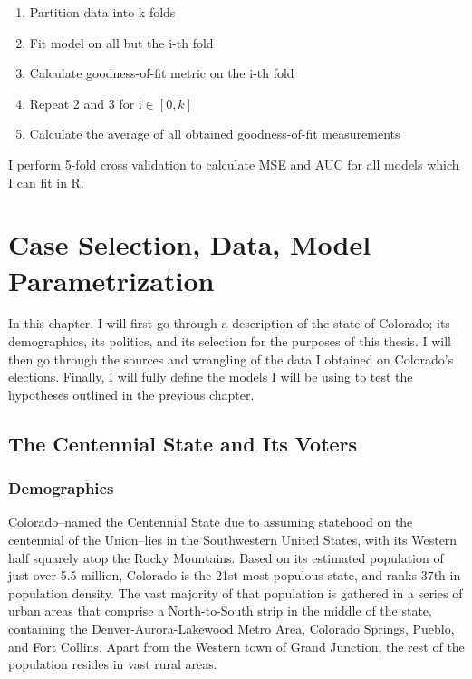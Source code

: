 \documentclass[12pt,twoside]{reedthesis}
\begin{document}
  \begin{enumerate}
  \item Partition data into k folds
  \item Fit model on all but the i-th fold
  \item Calculate goodness-of-fit metric on the i-th fold
  \item Repeat 2 and 3 for i$\in [0,k]$
  \item Calculate the average of all obtained goodness-of-fit measurements
  \end{enumerate}
  
  I perform 5-fold cross validation to calculate MSE and AUC for all
  models which I can fit in R.
  
  \chapter{Case Selection, Data, Model
  Parametrization}\label{case-selection-data-model-parametrization}
  
  In this chapter, I will first go through a description of the state of
  Colorado; its demographics, its politics, and its selection for the
  purposes of this thesis. I will then go through the sources and
  wrangling of the data I obtained on Colorado's elections. Finally, I
  will fully define the models I will be using to test the hypotheses
  outlined in the previous chapter.
  
  \section{The Centennial State and Its
  Voters}\label{the-centennial-state-and-its-voters}
  
  \subsection{Demographics}\label{demographics}
  
  Colorado--named the Centennial State due to assuming statehood on the
  centennial of the Union--lies in the Southwestern United States, with
  its Western half squarely atop the Rocky Mountains. Based on its
  estimated population of just over 5.5 million, Colorado is the 21st most
  populous state, and ranks 37th in population density. The vast majority
  of that population is gathered in a series of urban areas that comprise
  a North-to-South strip in the middle of the state, containing the
  Denver-Aurora-Lakewood Metro Area, Colorado Springs, Pueblo, and Fort
  Collins. Apart from the Western town of Grand Junction, the rest of the
  population resides in vast rural areas.
  
\end{document}
